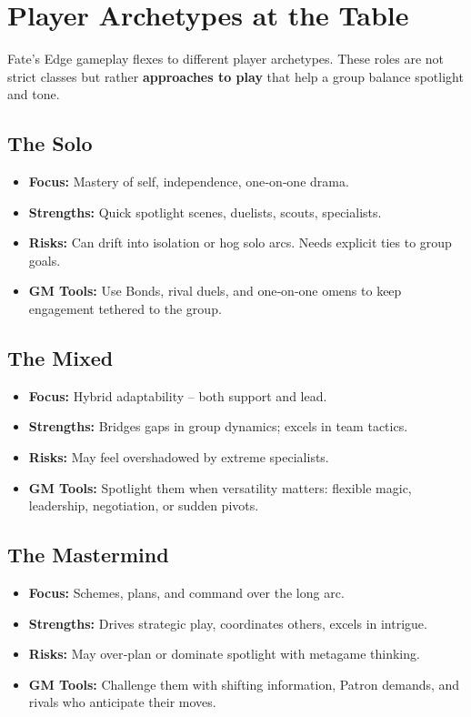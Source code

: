 \section{Player Archetypes at the Table}
\label{sec:player-archetypes}

Fate's Edge gameplay flexes to different player archetypes. These roles are not strict classes but rather \textbf{approaches to play} that help a group balance spotlight and tone.

\subsection{The Solo}
\begin{itemize}
  \item \textbf{Focus:} Mastery of self, independence, one‑on‑one drama.
  \item \textbf{Strengths:} Quick spotlight scenes, duelists, scouts, specialists.
  \item \textbf{Risks:} Can drift into isolation or hog solo arcs. Needs explicit ties to group goals.
  \item \textbf{GM Tools:} Use Bonds, rival duels, and one‑on‑one omens to keep engagement tethered to the group.
\end{itemize}

\subsection{The Mixed}
\begin{itemize}
  \item \textbf{Focus:} Hybrid adaptability -- both support and lead.
  \item \textbf{Strengths:} Bridges gaps in group dynamics; excels in team tactics.
  \item \textbf{Risks:} May feel overshadowed by extreme specialists.
  \item \textbf{GM Tools:} Spotlight them when versatility matters: flexible magic, leadership, negotiation, or sudden pivots.
\end{itemize}

\subsection{The Mastermind}
\begin{itemize}
  \item \textbf{Focus:} Schemes, plans, and command over the long arc.
  \item \textbf{Strengths:} Drives strategic play, coordinates others, excels in intrigue.
  \item \textbf{Risks:} May over‑plan or dominate spotlight with metagame thinking.
  \item \textbf{GM Tools:} Challenge them with shifting information, Patron demands, and rivals who anticipate their moves.
\end{itemize}

